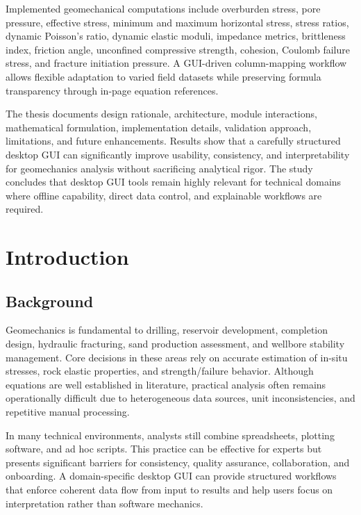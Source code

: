 \documentclass[12pt,a4paper]{report}
\begin{document}
Implemented geomechanical computations include overburden stress, pore pressure, effective stress, minimum and maximum horizontal stress, stress ratios, dynamic Poisson's ratio, dynamic elastic moduli, impedance metrics, brittleness index, friction angle, unconfined compressive strength, cohesion, Coulomb failure stress, and fracture initiation pressure. A GUI-driven column-mapping workflow allows flexible adaptation to varied field datasets while preserving formula transparency through in-page equation references.

The thesis documents design rationale, architecture, module interactions, mathematical formulation, implementation details, validation approach, limitations, and future enhancements. Results show that a carefully structured desktop GUI can significantly improve usability, consistency, and interpretability for geomechanics analysis without sacrificing analytical rigor. The study concludes that desktop GUI tools remain highly relevant for technical domains where offline capability, direct data control, and explainable workflows are required.

\tableofcontents
\listoftables
\listoffigures

\clearpage
{}

\chapter{Introduction}
\section{Background}
Geomechanics is fundamental to drilling, reservoir development, completion design, hydraulic fracturing, sand production assessment, and wellbore stability management. Core decisions in these areas rely on accurate estimation of in-situ stresses, rock elastic properties, and strength/failure behavior. Although equations are well established in literature, practical analysis often remains operationally difficult due to heterogeneous data sources, unit inconsistencies, and repetitive manual processing.

In many technical environments, analysts still combine spreadsheets, plotting software, and ad hoc scripts. This practice can be effective for experts but presents significant barriers for consistency, quality assurance, collaboration, and onboarding. A domain-specific desktop GUI can provide structured workflows that enforce coherent data flow from input to results and help users focus on interpretation rather than software mechanics.
\end{document}
